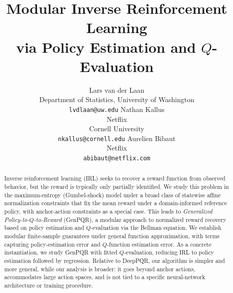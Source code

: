 \documentclass{article}
\title{Modular Inverse Reinforcement Learning\\via Policy Estimation and \(Q\)-Evaluation}
\author{%
  Lars van der Laan \\
  Department of Statistics, University of Washington \\
  \texttt{lvdlaan@uw.edu}
  \And
  Nathan Kallus \\
  Netflix \\
  Cornell University \\
  \texttt{nkallus@cornell.edu}
  \And
  Aurelien Bibaut \\
  Netflix \\
  \texttt{abibaut@netflix.com}
}
\newcommand{\1}{\mathbbm{1}}
\begin{document}
\maketitle
\begin{abstract}
Inverse reinforcement learning (IRL) seeks to recover a reward function from
observed behavior, but the reward is typically only partially identified. We
study this problem in the maximum-entropy (Gumbel-shock) model under a broad
class of statewise affine normalization constraints that fix the mean reward
under a domain-informed reference policy, with anchor-action constraints as a
special case. This leads to
\emph{Generalized Policy-to-\(Q\)-to-Reward} (GenPQR), a modular approach to
normalized reward recovery based on policy estimation and \(Q\)-evaluation via
the Bellman equation. We establish modular finite-sample guarantees under
general function approximation, with terms capturing policy-estimation error
and \(Q\)-function estimation error. As a concrete instantiation, we study
GenPQR with fitted \(Q\)-evaluation, reducing IRL to policy estimation
followed by regression. Relative to DeepPQR, our algorithm is simpler and more general, while our
analysis is broader: it goes beyond anchor actions, accommodates large action
spaces, and is not tied to a specific neural-network architecture or training
procedure.
\end{abstract}
\end{document}

